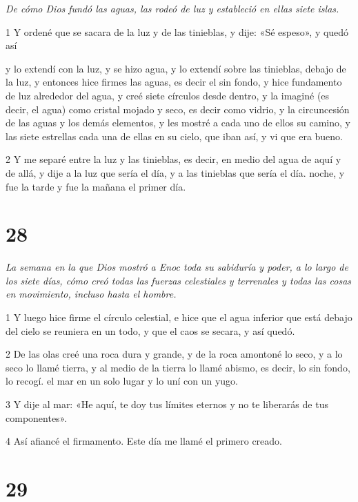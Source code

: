 \par \textit{De cómo Dios fundó las aguas, las rodeó de luz y estableció en ellas siete islas.}

\par 1 Y ordené que se sacara de la luz y de las tinieblas, y dije: «Sé espeso», y quedó así

y lo extendí con la luz, y se hizo agua, y lo extendí sobre las tinieblas, debajo de la luz, y entonces hice firmes las aguas, es decir el sin fondo, y hice fundamento de luz alrededor del agua, y creé siete círculos desde dentro, y la imaginé (es decir, el agua) como cristal mojado y seco, es decir como vidrio, y la circuncesión de las aguas y los demás elementos, y les mostré a cada uno de ellos su camino, y las siete estrellas cada una de ellas en su cielo, que iban así, y vi que era bueno.

\par 2 Y me separé entre la luz y las tinieblas, es decir, en medio del agua de aquí y de allá, y dije a la luz que sería el día, y a las tinieblas que sería el día. noche, y fue la tarde y fue la mañana el primer día.

\chapter{28}

\par \textit{La semana en la que Dios mostró a Enoc toda su sabiduría y poder, a lo largo de los siete días, cómo creó todas las fuerzas celestiales y terrenales y todas las cosas en movimiento, incluso hasta el hombre.}

\par 1 Y luego hice firme el círculo celestial, e hice que el agua inferior que está debajo del cielo se reuniera en un todo, y que el caos se secara, y así quedó.

\par 2 De las olas creé una roca dura y grande, y de la roca amontoné lo seco, y a lo seco lo llamé tierra, y al medio de la tierra lo llamé abismo, es decir, lo sin fondo, lo recogí. el mar en un solo lugar y lo uní con un yugo.

\par 3 Y dije al mar: «He aquí, te doy tus límites eternos y no te liberarás de tus componentes».

\par 4 Así afiancé el firmamento. Este día me llamé el primero creado.

\chapter{29}

